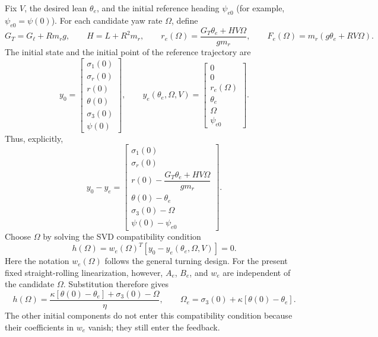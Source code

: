 Fix $V$, the desired lean $\theta_e$, and the initial reference heading
$\psi_{e0}$ (for example, $\psi_{e0}=\psi(0)$).
For each candidate yaw rate $\Omega$, define
\begin{equation}
G_T=G_\ell+Rm_rg,\qquad H=L+R^2m_r,\qquad
r_e(\Omega)=\frac{G_T\theta_e+HV\Omega}{gm_r},\qquad
F_e(\Omega)=m_r(g\theta_e+RV\Omega).
\end{equation}
The initial state and the initial point of the reference trajectory are
\begin{equation}
y_0=\begin{bmatrix}
\sigma_1(0)\\\sigma_r(0)\\r(0)\\\theta(0)\\\sigma_3(0)\\\psi(0)
\end{bmatrix},\qquad
y_e(\theta_e,\Omega,V)=\begin{bmatrix}
0\\0\\r_e(\Omega)\\\theta_e\\\Omega\\\psi_{e0}
\end{bmatrix}.
\end{equation}
Thus, explicitly,
\begin{equation}
\boxed{y_0-y_e=\begin{bmatrix}
\sigma_1(0)\\
\sigma_r(0)\\
r(0)-\dfrac{G_T\theta_e+HV\Omega}{gm_r}\\
\theta(0)-\theta_e\\
\sigma_3(0)-\Omega\\
\psi(0)-\psi_{e0}
\end{bmatrix}.}
\end{equation}
Choose $\Omega$ by solving the SVD compatibility condition
\begin{equation}
\boxed{h(\Omega)=w_e(\Omega)^T
[y_0-y_e(\theta_e,\Omega,V)]=0.}
\end{equation}
Here the notation $w_e(\Omega)$ follows the general turning design.
For the present fixed straight-rolling linearization, however,
$A_e$, $B_e$, and $w_e$ are independent of the candidate $\Omega$.
Substitution therefore gives
\begin{equation}
h(\Omega)=\frac{\kappa[\theta(0)-\theta_e]+\sigma_3(0)-\Omega}{\eta},
\qquad
\boxed{\Omega_e=\sigma_3(0)+\kappa[\theta(0)-\theta_e].}
\end{equation}
The other initial components do not enter this compatibility condition
because their coefficients in $w_e$ vanish; they still enter the feedback.

